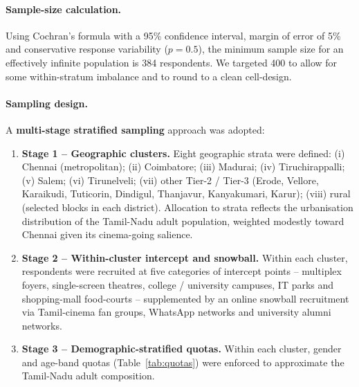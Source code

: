 \paragraph{Sample-size calculation.}  Using Cochran's
\citeyearpar{cochran1977} formula with a 95\% confidence interval,
margin of error of 5\% and conservative response variability
(\(p=0.5\)), the minimum sample size for an effectively infinite
population is 384 respondents.  We targeted 400 to allow for some
within-stratum imbalance and to round to a clean cell-design.

\paragraph{Sampling design.}  A \textbf{multi-stage stratified
sampling} approach was adopted:

\begin{enumerate}[itemsep=2pt]
\item \textbf{Stage 1 -- Geographic clusters.}  Eight geographic
      strata were defined: (i) Chennai (metropolitan); (ii)
      Coimbatore; (iii) Madurai; (iv) Tiruchirappalli; (v) Salem;
      (vi) Tirunelveli; (vii) other Tier-2 / Tier-3 (Erode, Vellore,
      Karaikudi, Tuticorin, Dindigul, Thanjavur, Kanyakumari,
      Karur); (viii) rural (selected blocks in each district).
      Allocation to strata reflects the urbanisation distribution
      of the Tamil-Nadu adult population, weighted modestly toward
      Chennai given its cinema-going salience.
\item \textbf{Stage 2 -- Within-cluster intercept and
      snowball.}  Within each cluster, respondents were recruited
      at five categories of intercept points -- multiplex foyers,
      single-screen theatres, college / university campuses, IT
      parks and shopping-mall food-courts -- supplemented by an
      online snowball recruitment via Tamil-cinema fan groups,
      WhatsApp networks and university alumni networks.
\item \textbf{Stage 3 -- Demographic-stratified quotas.}  Within
      each cluster, gender and age-band quotas (Table~\ref{tab:quotas})
      were enforced to approximate the Tamil-Nadu adult composition.
\end{enumerate}

